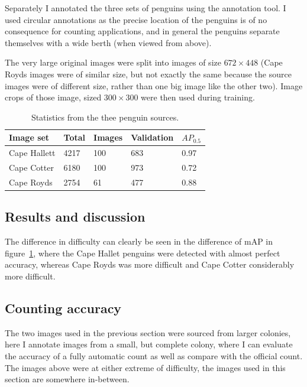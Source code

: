 Separately I annotated the three sets of penguins using the annotation tool. I used circular annotations as the precise location of the penguins is of no consequence for counting applications, and in general the penguins separate themselves with a wide berth (when viewed from above).  

The very large original images were split into images of size $ 672\times448 $ (Cape Royds images were of similar size, but not exactly the same because the source images were of different size, rather than one big image like the other two). Image crops of those image, sized $ 300\times300 $ were then used during training.

\begin{table}[ht]
  \centering
    \caption{Statistics from the thee penguin sources. }
  \begin{tabular}{ l  l  l  l  l }
    Image set & Total & Images & Validation & $AP_0.5$ \\
    \toprule
    Cape Hallett  & 4217 & 100 & 683 & 0.97 \\
    Cape Cotter   & 6180 & 100 & 973 & 0.72  \\
    Cape Royds    & 2754 & 61 & 477  & 0.88 \\
    \bottomrule
  \end{tabular}

\label{fig:penguin_statistics}
\end{table}





\subsection{Results and discussion}
 
The difference in difficulty can clearly be seen in the difference of mAP in figure~\ref{fig:penguin_statistics}, where the Cape Hallet penguins were detected with almost perfect accuracy, whereas Cape Royds was more difficult and Cape Cotter considerably more difficult. 






\subsection{Counting accuracy}

The two images used in the previous section were sourced from larger colonies, here I annotate images from a small, but complete colony, where I can evaluate the accuracy of a fully automatic count as well as compare with the official count. The images above were at either extreme of difficulty, the images used in this section are somewhere in-between. 



